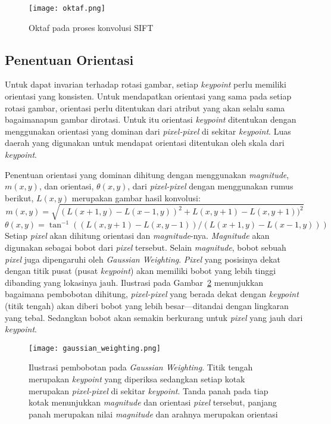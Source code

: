 \begin{figure}[H]
	\centering
	\texttt{[image: oktaf.png]}
	\caption{Oktaf pada proses konvolusi SIFT}
	\label{fig:oktaf}
\end{figure}

\subsection{Penentuan Orientasi}
Untuk dapat invarian terhadap rotasi gambar, setiap \textit{keypoint} perlu memiliki orientasi yang konsisten. Untuk mendapatkan orientasi yang sama pada setiap rotasi gambar, orientasi perlu ditentukan dari atribut yang akan selalu sama bagaimanapun gambar dirotasi. Untuk itu orientasi \textit{keypoint} ditentukan dengan menggunakan orientasi yang dominan dari \textit{pixel-pixel} di sekitar \textit{keypoint}. Luas daerah yang digunakan untuk mendapat orientasi ditentukan oleh skala dari \textit{keypoint}. 

Penentuan orientasi yang dominan dihitung dengan menggunakan \textit{magnitude}, $m(x,y)$, dan orientasi, $\theta(x,y)$, dari \textit{pixel-pixel} dengan menggunakan rumus berikut, $L(x,y)$ merupakan gambar hasil konvolusi:
\begin{equation}
	\label{eq:magnitude}
	m(x,y)=\sqrt{(L(x+1,y)-L(x-1,y))^{2}+L(x,y+1)-L(x,y+1))^{2}}
\end{equation}
\begin{equation}
	\label{eq:orientasi}
	\theta(x,y)=\tan^{-1}((L(x,y+1)-L(x,y-1))/(L(x+1,y)-L(x-1,y)))
\end{equation}
Setiap \textit{pixel} akan dihitung orientasi dan \textit{magnitude}-nya. \textit{Magnitude} akan digunakan sebagai bobot dari \textit{pixel} tersebut. Selain \textit{magnitude}, bobot sebuah \textit{pixel} juga dipengaruhi oleh \textit{Gaussian Weighting}. \textit{Pixel} yang posisinya dekat dengan titik pusat (pusat \textit{keypoint}) akan memiliki bobot yang lebih tinggi dibanding yang lokasinya jauh. Ilustrasi pada Gambar~\ref{fig:gaussian_weighting} menunjukkan bagaimana pembobotan dihitung, \textit{pixel-pixel} yang berada dekat dengan \textit{keypoint} (titik tengah) akan diberi bobot yang lebih besar---ditandai dengan lingkaran yang tebal. Sedangkan bobot akan semakin berkurang untuk \textit{pixel} yang jauh dari \textit{keypoint}.
\begin{figure}[H]
	\centering
	\texttt{[image: gaussian\_weighting.png]}
	\caption{Ilustrasi pembobotan pada \textit{Gaussian Weighting}. Titik tengah merupakan \textit{keypoint} yang diperiksa sedangkan setiap kotak merupakan \textit{pixel-pixel} di sekitar \textit{keypoint}. Tanda panah pada tiap kotak menunjukkan \textit{magnitude} dan orientasi \textit{pixel} tersebut, panjang panah merupakan nilai \textit{magnitude} dan arahnya merupakan orientasi}
	\label{fig:gaussian_weighting}
\end{figure} 

